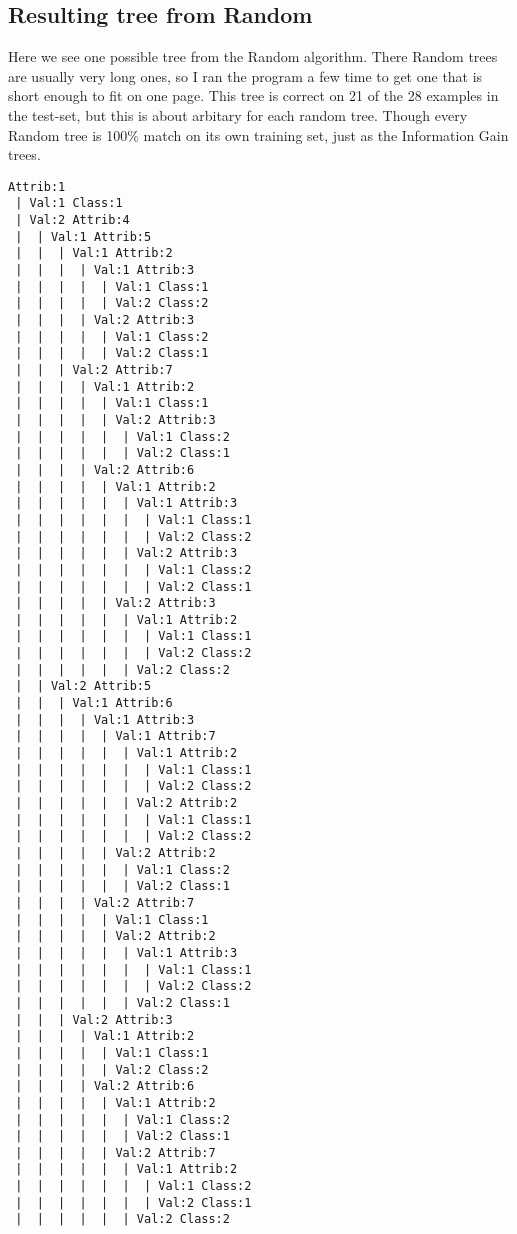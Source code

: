 \documentclass[english,a4paper]{scrartcl}
\begin{document}
\subsection{Resulting tree from Random}
Here we see one possible tree from the Random algorithm. There Random trees are
usually very long ones, so I ran the program a few time to get one that is short
enough to fit on one page. This tree is correct on 21 of the 28 examples
in the test-set, but this is about arbitary for each random tree. Though every
Random tree is 100\% match on its own training set, just as the Information Gain
trees.
\begin{lstlisting}
Attrib:1
 | Val:1 Class:1
 | Val:2 Attrib:4
 |  | Val:1 Attrib:5
 |  |  | Val:1 Attrib:2
 |  |  |  | Val:1 Attrib:3
 |  |  |  |  | Val:1 Class:1
 |  |  |  |  | Val:2 Class:2
 |  |  |  | Val:2 Attrib:3
 |  |  |  |  | Val:1 Class:2
 |  |  |  |  | Val:2 Class:1
 |  |  | Val:2 Attrib:7
 |  |  |  | Val:1 Attrib:2
 |  |  |  |  | Val:1 Class:1
 |  |  |  |  | Val:2 Attrib:3
 |  |  |  |  |  | Val:1 Class:2
 |  |  |  |  |  | Val:2 Class:1
 |  |  |  | Val:2 Attrib:6
 |  |  |  |  | Val:1 Attrib:2
 |  |  |  |  |  | Val:1 Attrib:3
 |  |  |  |  |  |  | Val:1 Class:1
 |  |  |  |  |  |  | Val:2 Class:2
 |  |  |  |  |  | Val:2 Attrib:3
 |  |  |  |  |  |  | Val:1 Class:2
 |  |  |  |  |  |  | Val:2 Class:1
 |  |  |  |  | Val:2 Attrib:3
 |  |  |  |  |  | Val:1 Attrib:2
 |  |  |  |  |  |  | Val:1 Class:1
 |  |  |  |  |  |  | Val:2 Class:2
 |  |  |  |  |  | Val:2 Class:2
 |  | Val:2 Attrib:5
 |  |  | Val:1 Attrib:6
 |  |  |  | Val:1 Attrib:3
 |  |  |  |  | Val:1 Attrib:7
 |  |  |  |  |  | Val:1 Attrib:2
 |  |  |  |  |  |  | Val:1 Class:1
 |  |  |  |  |  |  | Val:2 Class:2
 |  |  |  |  |  | Val:2 Attrib:2
 |  |  |  |  |  |  | Val:1 Class:1
 |  |  |  |  |  |  | Val:2 Class:2
 |  |  |  |  | Val:2 Attrib:2
 |  |  |  |  |  | Val:1 Class:2
 |  |  |  |  |  | Val:2 Class:1
 |  |  |  | Val:2 Attrib:7
 |  |  |  |  | Val:1 Class:1
 |  |  |  |  | Val:2 Attrib:2
 |  |  |  |  |  | Val:1 Attrib:3
 |  |  |  |  |  |  | Val:1 Class:1
 |  |  |  |  |  |  | Val:2 Class:2
 |  |  |  |  |  | Val:2 Class:1
 |  |  | Val:2 Attrib:3
 |  |  |  | Val:1 Attrib:2
 |  |  |  |  | Val:1 Class:1
 |  |  |  |  | Val:2 Class:2
 |  |  |  | Val:2 Attrib:6
 |  |  |  |  | Val:1 Attrib:2
 |  |  |  |  |  | Val:1 Class:2
 |  |  |  |  |  | Val:2 Class:1
 |  |  |  |  | Val:2 Attrib:7
 |  |  |  |  |  | Val:1 Attrib:2
 |  |  |  |  |  |  | Val:1 Class:2
 |  |  |  |  |  |  | Val:2 Class:1
 |  |  |  |  |  | Val:2 Class:2


\end{lstlisting}
\end{document}
